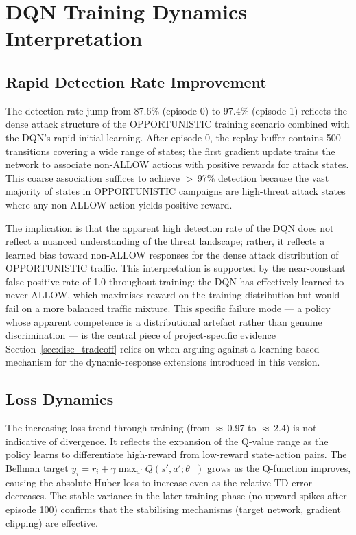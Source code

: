 \section{DQN Training Dynamics Interpretation}
\label{sec:disc_dqn}

\subsection{Rapid Detection Rate Improvement}

The detection rate jump from 87.6\% (episode 0) to 97.4\% (episode 1)
reflects the dense attack structure of the OPPORTUNISTIC training scenario
combined with the DQN's rapid initial learning.
After episode 0, the replay buffer contains 500 transitions covering a wide
range of states; the first gradient update trains the network to associate
non-ALLOW actions with positive rewards for attack states.
This coarse association suffices to achieve $>$\,97\% detection because the
vast majority of states in OPPORTUNISTIC campaigns are high-threat attack
states where any non-ALLOW action yields positive reward.

The implication is that the apparent high detection rate of the DQN does not
reflect a nuanced understanding of the threat landscape; rather, it reflects
a learned bias toward non-ALLOW responses for the dense attack distribution
of OPPORTUNISTIC traffic.
This interpretation is supported by the near-constant false-positive rate
of 1.0 throughout training: the DQN has effectively learned to never ALLOW,
which maximises reward on the training distribution but would fail on a more
balanced traffic mixture.
This specific failure mode --- a policy whose apparent competence is a
distributional artefact rather than genuine discrimination --- is the
central piece of project-specific evidence Section~\ref{sec:disc_tradeoff}
relies on when arguing against a learning-based mechanism for the
dynamic-response extensions introduced in this version.

\subsection{Loss Dynamics}

The increasing loss trend through training (from $\approx$\,0.97 to
$\approx$\,2.4) is not indicative of divergence.
It reflects the expansion of the Q-value range as the policy learns to
differentiate high-reward from low-reward state-action pairs.
The Bellman target $y_i = r_i + \gamma \max_{a'} Q(s', a'; \theta^-)$
grows as the Q-function improves, causing the absolute Huber loss to
increase even as the relative TD error decreases.
The stable variance in the later training phase (no upward spikes after
episode 100) confirms that the stabilising mechanisms (target network,
gradient clipping) are effective.


